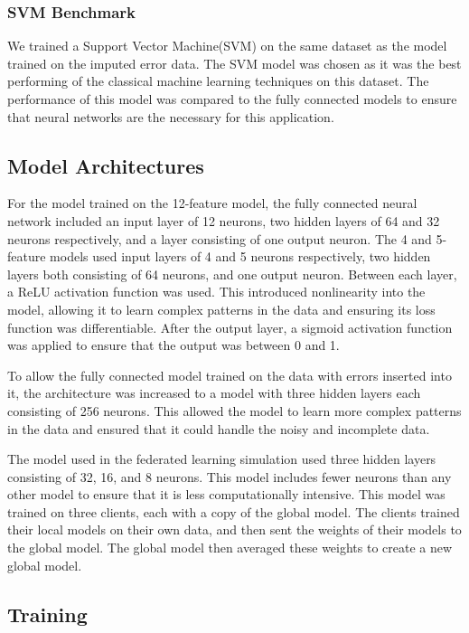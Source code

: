 \documentclass[conference]{IEEEtran}
\begin{document}
\subsubsection{SVM Benchmark}
We trained a Support Vector Machine(SVM) on the same dataset as the model trained on the imputed error data. The SVM model was chosen as it was the best performing of the classical machine learning techniques on this dataset. The performance of this model was compared to the fully connected models to ensure that neural networks are the necessary for this application.

\subsection{Model Architectures}
For the model trained on the 12-feature model, the fully
connected neural network included an input layer of 12
neurons, two hidden layers of 64 and 32 neurons
respectively, and a layer consisting of one output neuron.
The 4 and 5-feature models used input layers of 4 and 5
neurons respectively, two hidden layers both consisting of
64 neurons, and one output neuron. Between each layer, a
ReLU activation function was used. This introduced
nonlinearity into the model, allowing it to learn complex
patterns in the data and ensuring its loss function was
differentiable. After the output layer, a sigmoid activation
function was applied to ensure that the output was between 0
and 1.

To allow the fully connected model trained on the data with
errors inserted into it, the architecture was increased to a
model with three hidden layers each consisting of 256
neurons. This allowed the model to learn more complex
patterns in the data and ensured that it could handle the
noisy and incomplete data.

The model used in the federated learning simulation used
three hidden layers consisting of 32, 16, and 8 neurons.
This model includes fewer neurons than any other model to
ensure that it is less computationally intensive. This model
was trained on three clients, each with a copy of the global
model. The clients trained their local models on their own
data, and then sent the weights of their models to the
global model. The global model then averaged these weights
to create a new global model.

\subsection{Training}
\end{document}
